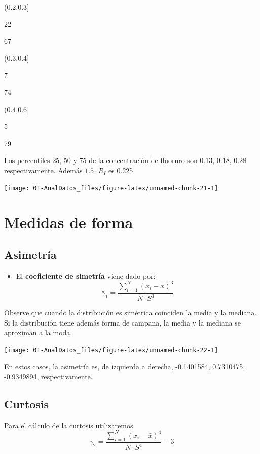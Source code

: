 \documentclass[]{book}
\providecommand{\tightlist}{%
  \setlength{\itemsep}{0pt}\setlength{\parskip}{0pt}}
\theoremstyle{definition}
\theoremstyle{definition}
\theoremstyle{definition}
\theoremstyle{remark}
\begin{document}
(0.2,0.3{]}

22

67

(0.3,0.4{]}

7

74

(0.4,0.6{]}

5

79

Los percentiles 25, 50 y 75 de la concentración de fluoruro son 0.13,
0.18, 0.28 respectivamente. Además \(1.5 \cdot R_I\) es 0.225

\begin{center}\texttt{[image: 01-AnalDatos\_files/figure-latex/unnamed-chunk-21-1]} \end{center}

\section{Medidas de forma}\label{medidas-de-forma}

\subsection{Asimetría}\label{asimetria}

\begin{itemize}
\tightlist
\item
  El \textbf{coeficiente de simetría} viene dado por:
  \[\gamma_1 = \frac{\sum_{i=1}^N (x_i - \bar{x})^3}{N \cdot S^3}\]
\end{itemize}

Observe que cuando la distribución es simétrica coinciden la media y la
mediana. Si la distribución tiene además forma de campana, la media y la
mediana se aproximan a la moda.

\begin{center}\texttt{[image: 01-AnalDatos\_files/figure-latex/unnamed-chunk-22-1]} \end{center}

En estos casos, la asimetría es, de izquierda a derecha, -0.1401584,
0.7310475, -0.9349894, respectivamente.

\subsection{Curtosis}\label{curtosis}

Para el cálculo de la curtosis utilizaremos
\[\gamma_2  =  \frac{\sum_{i=1}^N (x_i - \bar{x})^4}{N \cdot S^4}-3\]
\end{document}

